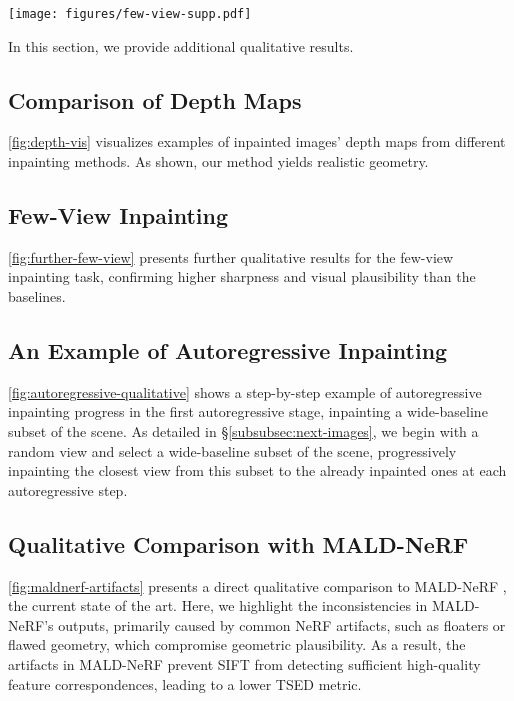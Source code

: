 \begin{figure*}
    \centering
    \texttt{[image: figures/few-view-supp.pdf]}
    \caption{Further qualitative results for the few-view inpainting task. Please zoom in for details.}
    \label{fig:further-few-view}
\end{figure*}

In this section, we provide additional qualitative results.

\subsection{Comparison of Depth Maps}
\cref{fig:depth-vis} visualizes examples of inpainted images' depth maps from different inpainting methods. As shown, our method yields realistic geometry.

\subsection{Few-View Inpainting}
\cref{fig:further-few-view} presents further qualitative results for the few-view inpainting task, confirming higher sharpness and visual plausibility than the baselines.

\subsection{An Example of Autoregressive Inpainting}
\label{supp:subsec:autoregressive-qualitative}
\cref{fig:autoregressive-qualitative} shows a step-by-step example of autoregressive inpainting progress in the first autoregressive stage, inpainting a wide-baseline subset of the scene. As detailed in \S\ref{subsubsec:next-images}, we begin with a random view and select a wide-baseline subset of the scene, progressively inpainting the closest view from this subset to the already inpainted ones at each autoregressive step.

\subsection{Qualitative Comparison with MALD-NeRF}
\label{supp:subsec:maldnerf-artifacts}
\cref{fig:maldnerf-artifacts} presents a direct qualitative comparison to MALD-NeRF \cite{lin2025taming}, the current state of the art. 
Here, we highlight the inconsistencies in MALD-NeRF's outputs, primarily caused by common NeRF artifacts, such as floaters or flawed geometry, which compromise geometric plausibility. As a result, the artifacts in MALD-NeRF prevent SIFT from detecting sufficient high-quality feature correspondences, leading to a lower TSED metric.

